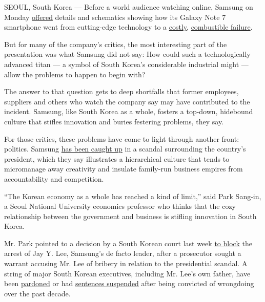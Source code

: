 SEOUL, South Korea --- Before a world audience watching online, Samsung
on Monday
\href{https://www.nytimes3xbfgragh.onion/2017/01/22/business/samsung-galaxy-note-7-battery-fires-report.html}{offered}
details and schematics showing how its Galaxy Note 7 smartphone went
from cutting-edge technology to a
\href{https://www.nytimes3xbfgragh.onion/2016/10/28/business/samsung-galaxy-note-7-profit.html}{costly},
\href{https://www.nytimes3xbfgragh.onion/2016/10/12/business/international/samsung-galaxy-note7-terminated.html}{combustible
failure}.

But for many of the company's critics, the most interesting part of the
presentation was what Samsung did not say: How could such a
technologically advanced titan --- a symbol of South Korea's
considerable industrial might --- allow the problems to happen to begin
with?

The answer to that question gets to deep shortfalls that former
employees, suppliers and others who watch the company say may have
contributed to the incident. Samsung, like South Korea as a whole,
fosters a top-down, hidebound culture that stifles innovation and buries
festering problems, they say.

For those critics, these problems have come to light through another
front: politics. Samsung
\href{https://www.nytimes3xbfgragh.onion/2017/01/15/world/asia/south-korea-samsung-arrest-jay-lee-park-geun-hye.html}{has
been caught up} in a scandal surrounding the country's president, which
they say illustrates a hierarchical culture that tends to micromanage
away creativity and insulate family-run business empires from
accountability and competition.

``The Korean economy as a whole has reached a kind of limit,'' said Park
Sang-in, a Seoul National University economics professor who thinks that
the cozy relationship between the government and business is stifling
innovation in South Korea.

Mr. Park pointed to a decision by a South Korean court last week
\href{https://www.nytimes3xbfgragh.onion/2017/01/18/world/asia/samsung-korea-president-impeachment.html}{to
block} the arrest of Jay Y. Lee, Samsung's de facto leader, after a
prosecutor sought a warrant accusing Mr. Lee of bribery in relation to
the presidential scandal. A string of major South Korean executives,
including Mr. Lee's own father, have been
\href{http://www.nytimes3xbfgragh.onion/2009/12/30/business/global/30samsung.html}{pardoned}
or had
\href{http://www.nytimes3xbfgragh.onion/2008/07/16/business/worldbusiness/16iht-samsung.1.14535273.html}{sentences
suspended} after being convicted of wrongdoing over the past decade.

